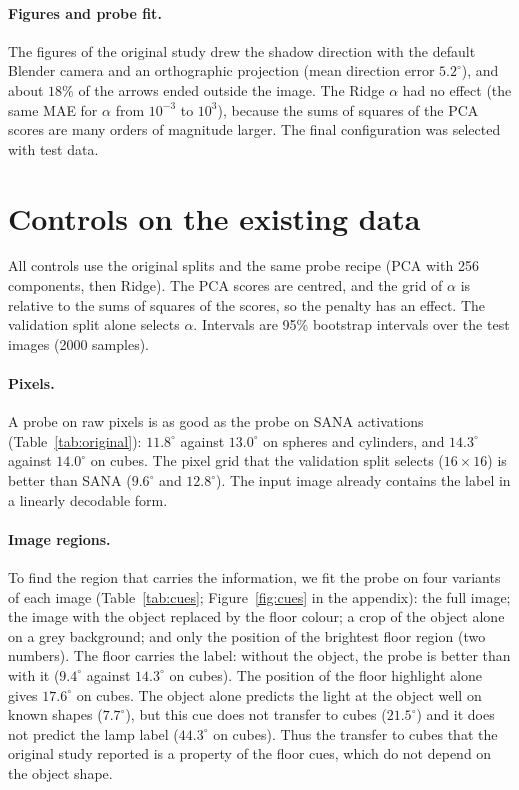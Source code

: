 \documentclass[10pt]{article}
\newcommand{\degr}{^\circ}
\begin{document}
\paragraph{Figures and probe fit.}
The figures of the original study drew the shadow direction with the default Blender camera and an orthographic projection (mean direction error $5.2\degr$), and about $18\%$ of the arrows ended outside the image.
The Ridge $\alpha$ had no effect (the same MAE for $\alpha$ from $10^{-3}$ to $10^{3}$), because the sums of squares of the PCA scores are many orders of magnitude larger.
The final configuration was selected with test data.

\section{Controls on the existing data}
\label{sec:controls}

All controls use the original splits and the same probe recipe (PCA with 256 components, then Ridge).
The PCA scores are centred, and the grid of $\alpha$ is relative to the sums of squares of the scores, so the penalty has an effect.
The validation split alone selects $\alpha$.
Intervals are 95\% bootstrap intervals over the test images (2000 samples).

\paragraph{Pixels.}
A probe on raw pixels is as good as the probe on SANA activations (Table~\ref{tab:original}): $11.8\degr$ against $13.0\degr$ on spheres and cylinders, and $14.3\degr$ against $14.0\degr$ on cubes.
The pixel grid that the validation split selects ($16\times16$) is better than SANA ($9.6\degr$ and $12.8\degr$).
The input image already contains the label in a linearly decodable form.

\paragraph{Image regions.}
To find the region that carries the information, we fit the probe on four variants of each image (Table~\ref{tab:cues}; Figure~\ref{fig:cues} in the appendix): the full image; the image with the object replaced by the floor colour; a crop of the object alone on a grey background; and only the position of the brightest floor region (two numbers).
The floor carries the label: without the object, the probe is better than with it ($9.4\degr$ against $14.3\degr$ on cubes).
The position of the floor highlight alone gives $17.6\degr$ on cubes.
The object alone predicts the light at the object well on known shapes ($7.7\degr$), but this cue does not transfer to cubes ($21.5\degr$) and it does not predict the lamp label ($44.3\degr$ on cubes).
Thus the transfer to cubes that the original study reported is a property of the floor cues, which do not depend on the object shape.
\end{document}
